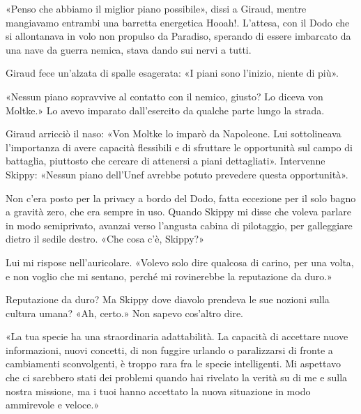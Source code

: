 «Penso che abbiamo il miglior piano possibile», dissi a Giraud, mentre
mangiavamo entrambi una barretta energetica Hooah!. L'attesa, con il
Dodo che si allontanava in volo non propulso da Paradiso, sperando di
essere imbarcato da una nave da guerra nemica, stava dando sui nervi a
tutti.

Giraud fece un'alzata di spalle esagerata: «I piani sono l'inizio,
niente di più».

«Nessun piano sopravvive al contatto con il nemico, giusto? Lo diceva
von Moltke.» Lo avevo imparato dall'esercito da qualche parte lungo la
strada.

Giraud arricciò il naso: «Von Moltke lo imparò da Napoleone. Lui
sottolineava l'importanza di avere capacità flessibili e di sfruttare le
opportunità sul campo di battaglia, piuttosto che cercare di attenersi a
piani dettagliati». Intervenne Skippy: «Nessun piano dell'Unef avrebbe
potuto prevedere questa opportunità».

\hfill\break

Non c'era posto per la privacy a bordo del Dodo, fatta eccezione per il
solo bagno a gravità zero, che era sempre in uso. Quando Skippy mi disse
che voleva parlare in modo semiprivato, avanzai verso l'angusta cabina
di pilotaggio, per galleggiare dietro il sedile destro. «Che cosa c'è,
Skippy?»

Lui mi rispose nell'auricolare. «Volevo solo dire qualcosa di carino,
per una volta, e non voglio che mi sentano, perché mi rovinerebbe la
reputazione da duro.»

Reputazione da duro? Ma Skippy dove diavolo prendeva le sue nozioni
sulla cultura umana? «Ah, certo.» Non sapevo cos'altro dire.

«La tua specie ha una straordinaria adattabilità. La capacità di
accettare nuove informazioni, nuovi concetti, di non fuggire urlando o
paralizzarsi di fronte a cambiamenti sconvolgenti, è troppo rara fra le
specie intelligenti. Mi aspettavo che ci sarebbero stati dei problemi
quando hai rivelato la verità su di me e sulla nostra missione, ma i
tuoi hanno accettato la nuova situazione in modo ammirevole e veloce.»


